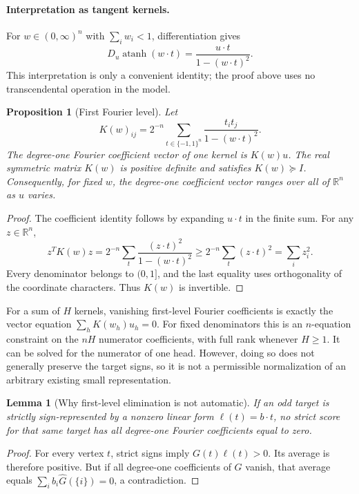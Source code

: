 \documentclass[11pt]{article}
\newtheorem{proposition}{Proposition}
\newtheorem{lemma}{Lemma}
\begin{document}
\paragraph{Interpretation as tangent kernels.}
For $w\in(0,\infty)^n$ with $\sum_iw_i<1$, differentiation gives
\[
 D_u\operatorname{atanh}(w\cdot t)
 =\frac{u\cdot t}{1-(w\cdot t)^2}.
\]
This interpretation is only a convenient identity; the proof above uses
no transcendental operation in the model.

\begin{proposition}[First Fourier level]
Let
\[
 K(w)_{ij}=2^{-n}\sum_{t\in\{-1,1\}^n}
       \frac{t_i t_j}{1-(w\cdot t)^2}.
\]
The degree-one Fourier coefficient vector of one kernel is $K(w)u$.
The real symmetric matrix $K(w)$ is positive definite and satisfies
$K(w)\succeq I$. Consequently, for fixed $w$, the degree-one coefficient
vector ranges over all of $\mathbb R^n$ as $u$ varies.
\end{proposition}

\begin{proof}
The coefficient identity follows by expanding $u\cdot t$ in the finite
sum. For any $z\in\mathbb R^n$,
\[
 z^TK(w)z
 =2^{-n}\sum_t\frac{(z\cdot t)^2}{1-(w\cdot t)^2}
 \geq 2^{-n}\sum_t(z\cdot t)^2=\sum_i z_i^2.
\]
Every denominator belongs to $(0,1]$, and the last equality uses
orthogonality of the coordinate characters. Thus $K(w)$ is invertible.
\end{proof}

For a sum of $H$ kernels, vanishing first-level Fourier coefficients is
exactly the vector equation $\sum_hK(w_h)u_h=0$. For fixed denominators
this is an $n$-equation constraint on the $nH$ numerator coefficients,
with full rank whenever $H\geq1$. It can be solved for the numerator
of one head. However, doing so does not generally preserve the target
signs, so it is not a permissible normalization of an arbitrary existing
small representation.

\begin{lemma}[Why first-level elimination is not automatic]
If an odd target is strictly sign-represented by a nonzero linear form
$\ell(t)=b\cdot t$, no strict score for that same target has all
degree-one Fourier coefficients equal to zero.
\end{lemma}

\begin{proof}
For every vertex $t$, strict signs imply $G(t)\ell(t)>0$.
Its average is therefore positive. But if all degree-one coefficients
of $G$ vanish, that average equals $\sum_i b_i\widehat G(\{i\})=0$,
a contradiction.
\end{proof}
\end{document}
